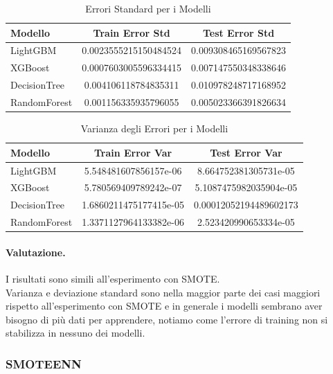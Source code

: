 \begin{table}[H]
    \centering
    \begin{tabular}{lcc}
    \toprule
    \textbf{Modello} & \textbf{Train Error Std} & \textbf{Test Error Std} \\
    \midrule
    LightGBM & 0.0023555215150484524 & 0.009308465169567823 \\
    XGBoost & 0.0007603005596334415 & 0.007147550348338646 \\
    DecisionTree & 0.004106118784835311 & 0.010978248717168952 \\
    RandomForest & 0.001156335935796055 & 0.005023366391826634 \\
    \bottomrule
    \end{tabular}
    \caption{Errori Standard per i Modelli}
    
\end{table}

\begin{table}[H]
    \centering
    \begin{tabular}{lcc}
    \toprule
    \textbf{Modello} & \textbf{Train Error Var} & \textbf{Test Error Var} \\
    \midrule
    LightGBM & 5.548481607856157e-06 & 8.664752381305731e-05 \\
    XGBoost & 5.780569409789242e-07 & 5.1087475982035904e-05 \\
    DecisionTree & 1.6860211475177415e-05 & 0.00012052194489602173 \\
    RandomForest & 1.3371127964133382e-06 & 2.523420990653334e-05 \\
    \bottomrule
    \end{tabular}
    \caption{Varianza degli Errori per i Modelli}
    
\end{table}

\paragraph{Valutazione.} I risultati sono simili all'esperimento con SMOTE. \\ Varianza e deviazione standard sono nella maggior parte dei casi maggiori rispetto all'esperimento con SMOTE e in generale i modelli sembrano aver bisogno di più dati per apprendere, notiamo come l'errore di training non si stabilizza in nessuno dei modelli.

\subsubsection{SMOTEENN}
